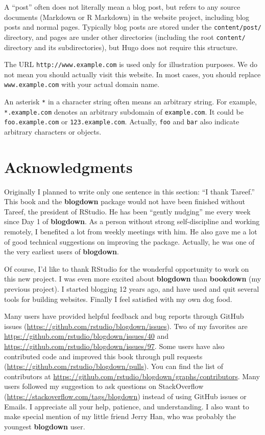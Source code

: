 \documentclass[12pt,]{krantz}
\theoremstyle{definition}
\theoremstyle{definition}
\theoremstyle{definition}
\theoremstyle{remark}
\begin{document}
A ``post'' often does not literally mean a blog post, but refers to any
source documents (Markdown or R Markdown) in the website project,
including blog posts and normal pages. Typically blog posts are stored
under the \texttt{content/post/} directory, and pages are under other
directories (including the root \texttt{content/} directory and its
subdirectories), but Hugo does not require this structure.

The URL \texttt{http://www.example.com} is used only for illustration
purposes. We do not mean you should actually visit this website. In most
cases, you should replace \texttt{www.example.com} with your actual
domain name.

An asterisk \texttt{*} in a character string often means an arbitrary
string. For example, \texttt{*.example.com} denotes an arbitrary
subdomain of \texttt{example.com}. It could be \texttt{foo.example.com}
or \texttt{123.example.com}. Actually, \texttt{foo} and \texttt{bar}
also indicate arbitrary characters or objects.

\hypertarget{acknowledgments}{%
\section*{Acknowledgments}\label{acknowledgments}}


Originally I planned to write only one sentence in this section: ``I
thank Tareef.'' This book and the \textbf{blogdown} package would not
have been finished without Tareef, the president of RStudio. He has been
``gently nudging'' me every week since Day 1 of \textbf{blogdown}. As a
person without strong self-discipline and working remotely, I benefited
a lot from weekly meetings with him. He also gave me a lot of good
technical suggestions on improving the package. Actually, he was one of
the very earliest users of \textbf{blogdown}.

Of course, I'd like to thank RStudio for the wonderful opportunity to
work on this new project. I was even more excited about
\textbf{blogdown} than \textbf{bookdown} (my previous project). I
started blogging 12 years ago, and have used and quit several tools for
building websites. Finally I feel satisfied with my own dog food.

Many users have provided helpful feedback and bug reports through GitHub
issues (\url{https://github.com/rstudio/blogdown/issues}). Two of my
favorites are \url{https://github.com/rstudio/blogdown/issues/40} and
\url{https://github.com/rstudio/blogdown/issues/97}. Some users have
also contributed code and improved this book through pull requests
(\url{https://github.com/rstudio/blogdown/pulls}). You can find the list
of contributors at
\url{https://github.com/rstudio/blogdown/graphs/contributors}. Many
users followed my suggestion to ask questions on StackOverflow
(\url{https://stackoverflow.com/tags/blogdown}) instead of using GitHub
issues or Emails. I appreciate all your help, patience, and
understanding. I also want to make special mention of my little friend
Jerry Han, who was probably the youngest \textbf{blogdown} user.
\end{document}
